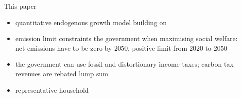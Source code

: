 \documentclass[11pt,aspectratio=169]{beamer}
\begin{document}
\begin{frame}{This paper}
	\begin{itemize}
		\item<+-> quantitative \alert{endogenous growth} model building on \cite{Fried2018ClimateAnalysis}
		\vspace{3mm}
		\item<+->  \alert{emission limit constraints} the government when  {maximising social welfare}: \\ net emissions have to be zero by 2050, positive limit from 2020 to 2050
		\vspace{3mm}
		\item<+-> the government can use \alert{fossil} and \alert{distortionary income taxes}; carbon tax revenues are rebated lump sum
		\vspace{3mm}
		\item<+->  \alert{representative} household  
		
	\end{itemize}
\end{frame}
\end{document}
